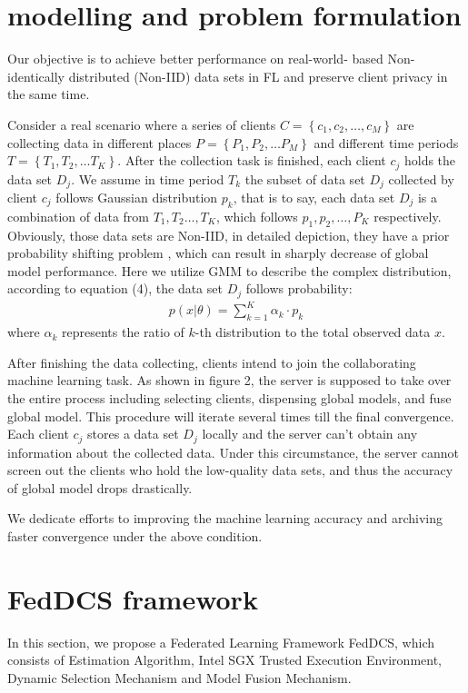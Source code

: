 \documentclass[conference]{IEEEtran}
\begin{document}
\section{modelling and  problem formulation}
Our objective is to achieve better performance on real-world-
based Non-identically distributed (Non-IID) data sets in 
FL and preserve client privacy in the same time.

Consider a real scenario where a series of clients
 $C = \left\{c_1,c_2,\dots, c_M \right\}$ are collecting data in different places
$P = \left\{P_1,P_2,\dots P_M \right\}$ and different time periods
$T = \left\{T_1,T_2,\dots T_K \right\}$. After the collection task is
finished, each client $c_j$ holds the data set $D_j$. We assume in
time period $T_k$ the subset of data set $D_j$ collected by client 
$c_j$ follows Gaussian distribution $p_k$, that is to say, each
data set $D_j$ is a combination of data from $T_1,T_2 \dots ,T_K$,
which follows $p_1,p_2, \dots, P_K$ respectively. Obviously, 
those data sets are Non-IID, in detailed depiction, they have a 
prior probability shifting problem \cite{kairouz2019advances}, which can result 
in sharply decrease of global model performance. Here we 
utilize GMM to describe the complex distribution, according 
to equation (4), the data set $D_j$ follows probability:
\begin{align}
  p(x|\theta) = \sum\limits_{k = 1}^{K} \alpha_k\cdot p_k
\end{align}
where $\alpha_k$ represents the ratio of $k$-th distribution to the total observed data $x$.

After finishing the data collecting, clients intend 
to join the collaborating machine learning task. As 
shown in figure 2, the server is supposed to take
over the entire process including selecting clients,
dispensing global models, and fuse global model. 
This procedure will iterate several times 
till the final convergence. Each client $c_j$ 
stores a data set $D_j$ locally and the server 
can't obtain any information about the collected data.
Under this circumstance, the server cannot screen out
the clients who hold the low-quality data sets, and thus 
the accuracy of global model drops drastically.

We dedicate efforts to improving the machine learning accuracy 
and archiving faster convergence under the above condition.


\section{FedDCS framework}
In this section, we propose a Federated Learning Framework FedDCS, which consists of Estimation Algorithm,
Intel SGX Trusted Execution Environment, Dynamic Selection Mechanism and Model Fusion Mechanism.
\end{document}
